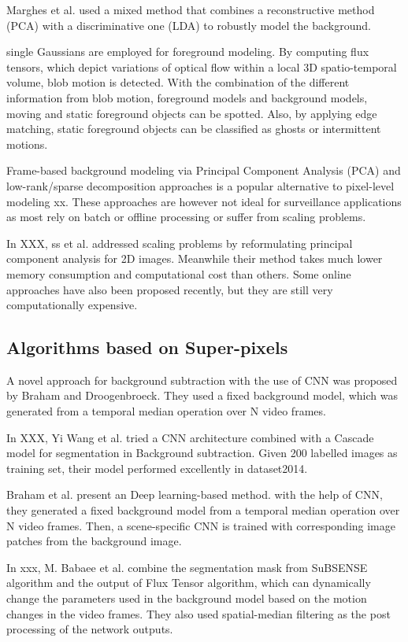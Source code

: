 \documentclass[journal]{IEEEtran}
\begin{document}
Marghes et al.
used a mixed method that combines a reconstructive method (PCA) with a discriminative one (LDA) to robustly model the background.

single Gaussians are employed for foreground modeling.
By computing flux tensors, which depict variations of optical flow within a local 3D spatio-temporal volume, blob motion is detected.
With the combination of the different information from blob motion, foreground models and background models, moving and static foreground objects can be spotted.
Also, by applying edge matching, static foreground objects can be classified as ghosts or intermittent motions.

Frame-based background modeling via Principal Component Analysis (PCA) and low-rank/sparse decomposition approaches is a popular alternative to pixel-level modeling xx.
These approaches are however not ideal for surveillance applications as most rely on batch or offline processing or suffer from scaling problems.

In XXX, ss et al.
addressed scaling problems by reformulating principal component analysis for 2D images.
Meanwhile their method takes much lower memory consumption and computational cost than others.
Some online approaches have also been proposed recently, but they are still very computationally expensive.


\subsection{Algorithms based on Super-pixels}
\label{sec_sup}
A novel approach for background subtraction with the use of CNN was proposed by Braham and Droogenbroeck.
They used a fixed background model, which was generated from a temporal median operation over N video frames.

In XXX, Yi Wang et al.
tried a CNN architecture combined with a Cascade model for segmentation in Background subtraction.
Given 200 labelled images as training set, their model performed excellently in dataset2014.

Braham et al.
present an Deep learning-based method.
with the help of CNN, they generated a fixed background model from a temporal median operation over N video frames.
Then, a scene-specific CNN is trained with corresponding image patches from the background image.

In xxx, M.
Babaee et al.
combine the segmentation mask from SuBSENSE algorithm and the output of Flux Tensor algorithm, which can dynamically change the parameters used in the background model based on the motion changes in the video frames.
They also used spatial-median filtering as the post processing of the network outputs.
\end{document}

